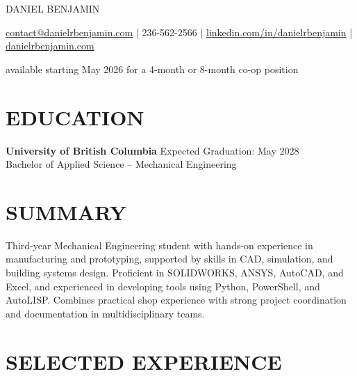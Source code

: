 \documentclass[11pt]{article}       %
\begin{document}
\centerline{\Huge \color{accentColour} DANIEL BENJAMIN}

\vspace{5pt}

\centerline{\href{mailto:contact@danielrbenjamin.com}{contact@danielrbenjamin.com} | 236-562-2566 | \href{https://www.linkedin.com/in/danielrbenjamin}{linkedin.com/in/danielrbenjamin} | \href{https://www.danielrbenjamin.com/}{danielrbenjamin.com}}

\centerline{available starting May 2026 for a 4-month or 8-month co-op position}

\vspace{-6.5pt}

\section*{EDUCATION}
\textbf{University of British Columbia} \hfill Expected Graduation: May 2028
\\Bachelor of Applied Science – Mechanical Engineering

\vspace{-6.5pt}

\section*{SUMMARY}
Third-year Mechanical Engineering student with hands-on experience in manufacturing and prototyping, supported by skills in CAD, simulation, and building systems design. Proficient in SOLIDWORKS, ANSYS, AutoCAD, and Excel, and experienced in developing tools using Python, PowerShell, and AutoLISP. Combines practical shop experience with strong project coordination and documentation in multidisciplinary teams.
\vspace{-3pt}

\section*{SELECTED EXPERIENCE}
\end{document}
